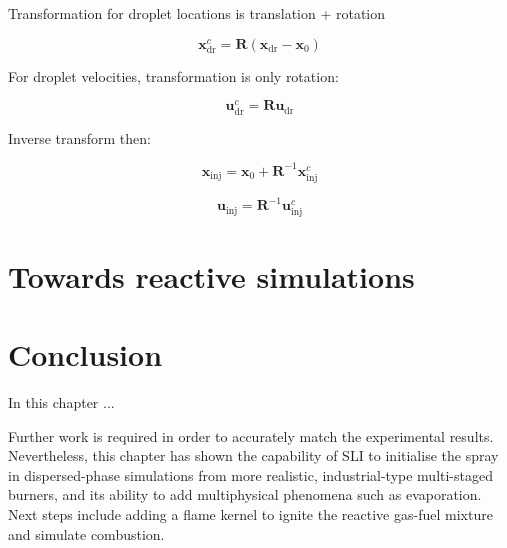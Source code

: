 Transformation for droplet locations is translation + rotation

\begin{equation}
\boldsymbol{x}^c_\mathrm{dr} = \boldsymbol{R} \left( \boldsymbol{x}_\mathrm{dr} -  \boldsymbol{x}_0 \right)
\end{equation}

For droplet velocities, transformation is only rotation:

\begin{equation}
\boldsymbol{u}^c_\mathrm{dr} = \boldsymbol{R} \boldsymbol{u}_\mathrm{dr}
\end{equation}

Inverse transform then:

\begin{equation}
\boldsymbol{x}_\mathrm{inj} = \boldsymbol{x}_0 + \boldsymbol{R}^{-1} \boldsymbol{x}_\mathrm{inj}^c
\end{equation}

\begin{equation}
\boldsymbol{u}_\mathrm{inj} = \boldsymbol{R}^{-1} \boldsymbol{u}_\mathrm{inj}^c
\end{equation}

\section{Towards reactive simulations}



\section{Conclusion}

In this chapter ...

Further work is required in order to accurately match the experimental results. Nevertheless, this chapter has shown the capability of SLI to initialise the spray in dispersed-phase simulations from more realistic, industrial-type multi-staged burners, and its ability to add multiphysical phenomena such as evaporation. Next steps include adding a flame kernel to ignite the reactive gas-fuel mixture and simulate combustion.